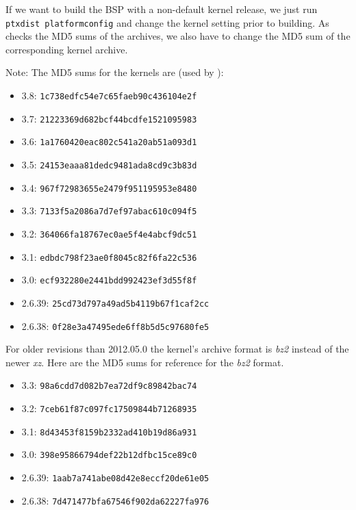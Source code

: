 If we want to build the BSP with a non-default kernel release, we just run
\texttt{ptxdist platformconfig} and change the kernel setting prior to building.
As \ptxdist{} checks the MD5 sums of the archives, we also have to change the
MD5 sum of the corresponding kernel archive.

Note: The MD5 sums for the kernels are (used by \ptxdist{}):
\begin{itemize}
	\item 3.8: \texttt{1c738edfc54e7c65faeb90c436104e2f}
	\item 3.7: \texttt{21223369d682bcf44bcdfe1521095983}
	\item 3.6: \texttt{1a1760420eac802c541a20ab51a093d1}
	\item 3.5: \texttt{24153eaaa81dedc9481ada8cd9c3b83d}
	\item 3.4: \texttt{967f72983655e2479f951195953e8480}
	\item 3.3: \texttt{7133f5a2086a7d7ef97abac610c094f5}
	\item 3.2: \texttt{364066fa18767ec0ae5f4e4abcf9dc51}
	\item 3.1: \texttt{edbdc798f23ae0f8045c82f6fa22c536}
	\item 3.0: \texttt{ecf932280e2441bdd992423ef3d55f8f}
	\item 2.6.39: \texttt{25cd73d797a49ad5b4119b67f1caf2cc}
	\item 2.6.38: \texttt{0f28e3a47495ede6ff8b5d5c97680fe5}
\end{itemize}

For older \ptxdist{} revisions than 2012.05.0 the kernel's archive format
is \textit{bz2} instead of the newer \textit{xz}. Here are the MD5 sums
for reference for the \textit{bz2} format.

\begin{itemize}
	\item 3.3: \texttt{98a6cdd7d082b7ea72df9c89842bac74}
	\item 3.2: \texttt{7ceb61f87c097fc17509844b71268935}
	\item 3.1: \texttt{8d43453f8159b2332ad410b19d86a931}
	\item 3.0: \texttt{398e95866794def22b12dfbc15ce89c0}
	\item 2.6.39: \texttt{1aab7a741abe08d42e8eccf20de61e05}
	\item 2.6.38: \texttt{7d471477bfa67546f902da62227fa976}
\end{itemize}



